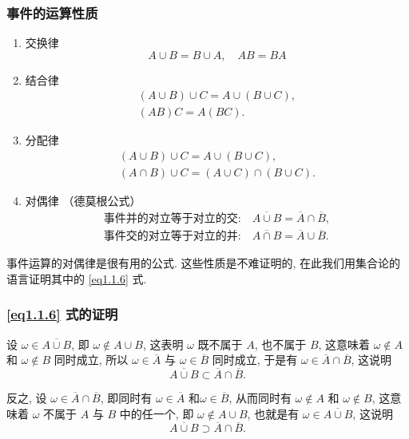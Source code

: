 \subsubsection{事件的运算性质}
\begin{enumerate}
  \item 交换律
  \begin{equation}\label{eq1.1.1}
    A \cup B = B \cup A, \quad AB = BA
  \end{equation}
  \item 结合律
  \begin{gather}
    (A \cup B) \cup C = A \cup (B \cup C),\label{eq1.1.2}\\
    (AB)C = A(BC).\label{eq:1.1.3}
  \end{gather}
  \item 分配律
  \begin{gather}
    (A \cup B) \cup C = A \cup (B \cup C),\label{eq1.1.4}\\
    (A \cap B) \cup C = (A \cup C) \cap (B \cup C).\label{eq1.1.5}
  \end{gather}
  \item 对偶律 （德莫根公式）
  \begin{gather}
    \text{事件并的对立等于对立的交:} \quad \overline{A \cup B} = \overline{A} \cap \overline{B},\label{eq1.1.6}\\
    \text{事件交的对立等于对立的并:} \quad \overline{A \cap B} = \overline{A} \cup \overline{B}.\label{eq1.1.7}
  \end{gather}
\end{enumerate}

事件运算的对偶律是很有用的公式.
这些性质是不难证明的,
在此我们用集合论的语言证明其中的 \eqref{eq1.1.6} 式.

\subsubsection*{\eqref{eq1.1.6} 式的证明}

设 $\omega \in \overline{A \cup B}$,
即 $\omega \notin A \cup B$,
这表明 $\omega$ 既不属于 $A$,
也不属于 $B$,
这意味着 $\omega \notin A$ 和 $\omega \notin B$ 同时成立,
所以 $\omega \in \overline{A}$ 与 $\omega \in \overline{B}$ 同时成立,
于是有 $\omega \in \overline{A} \cap \overline{B}$,
这说明
\[
  \overline{A \cup B} \subset \overline{A} \cap \overline{B}.
\]

反之,
设 $\omega \in \overline{A} \cap \overline{B}$,
即同时有 $\omega \in \overline{A}$ 和$\omega \in \overline{B}$,
从而同时有 $\omega \notin A$ 和 $\omega \notin B$,
这意味着 $\omega$ 不属于 $A$ 与 $B$ 中的任一个,
即 $\omega \notin A \cup B$,
也就是有 $\omega \in \overline{A \cup B}$,
这说明
\[
  \overline{A \cup B} \supset \overline{A} \cap \overline{B}.
\]


